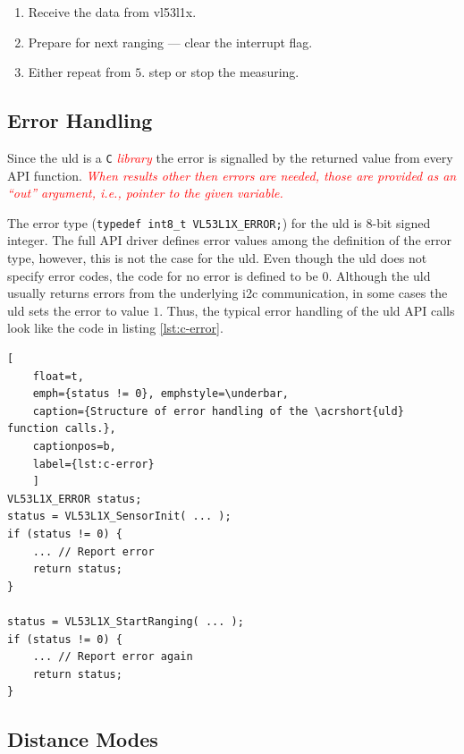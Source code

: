 \documentclass[
  digital,     %
  oneside,     %
  nosansbold,  %
  nocolorbold, %
  lof,         %
  lot,         %
]{fithesis4}
\newcommand{\TODO}[1]{\textcolor{red}{\textit{#1}}}
\begin{document}
{{{\begin{enumerate}
    \item Receive the data from \gls{vl53l1x}.
    
    \item Prepare for next ranging --- clear the interrupt flag.
    
    \item Either repeat from $5.$ step or stop the measuring.
\end{enumerate}


\subsection{ Error Handling }

Since the \acrshort{uld} is a \verb|C| \TODO{library} the error is signalled by the returned value from every API function. \TODO{When results other then errors are needed, those are provided as an ``out'' argument, i.e., pointer to the given variable.}

The error type (\lstinline[breaklines=false]|typedef int8_t VL53L1X_ERROR;|) for the \acrshort{uld} is 8-bit signed integer. The full API driver defines error values among the definition of the error type, however, this is not the case for the \acrshort{uld}. Even though the \acrshort{uld} does not specify error codes, the code for no error is defined to be $0$. Although the \acrshort{uld} usually returns errors from the underlying \acrshort{i2c} communication, in some cases the \acrshort{uld} sets the error to value $1$. Thus, the typical error handling of the \acrshort{uld} API calls look like the code in listing \ref{lst:c-error}.

\begin{lstlisting}[
    float=t,
    emph={status != 0}, emphstyle=\underbar,
    caption={Structure of error handling of the \acrshort{uld} function calls.},
    captionpos=b,
    label={lst:c-error}
    ]
VL53L1X_ERROR status;
status = VL53L1X_SensorInit( ... );
if (status != 0) {
    ... // Report error
    return status;
}

status = VL53L1X_StartRanging( ... );
if (status != 0) {
    ... // Report error again
    return status;
}
\end{lstlisting}

\subsection{ Distance Modes } \label{distance-modes}

}}}
\end{document}
